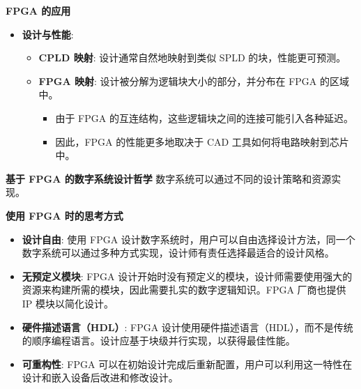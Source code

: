 \begin{frame}[allowframebreaks]{\textbf{FPGA 的应用}}
\begin{itemize}
\begin{itemize}
    \begin{itemize}
    \tightlist
    \item
        利用可编程部分``执行''软件，而不是将软件编译为在常规 CPU 上执行。
    \item
        相关资源：IEEE 举办的 FPGA-Based Custom Computing Workshop
        (FCCM)。
    \end{itemize}
    \end{itemize}
\item
    \textbf{设计与性能}:

    \begin{itemize}
    \tightlist
    \item
    \textbf{CPLD 映射}: 设计通常自然地映射到类似 SPLD
    的块，性能更可预测。
    \item
    \textbf{FPGA 映射}: 设计被分解为逻辑块大小的部分，并分布在 FPGA
    的区域中。

    \begin{itemize}
    \tightlist
    \item
        由于 FPGA 的互连结构，这些逻辑块之间的连接可能引入各种延迟。
    \item
        因此，FPGA 的性能更多地取决于 CAD 工具如何将电路映射到芯片中。
    \end{itemize}
    \end{itemize}
\end{itemize}
\end{frame}

\begin{frame}[allowframebreaks]{\textbf{基于 FPGA 的数字系统设计哲学}}
    数字系统可以通过不同的设计策略和资源实现。



\begin{block}{\textbf{使用 FPGA 时的思考方式}}
\begin{itemize}
\tightlist
\item
    \textbf{设计自由}: 使用 FPGA
    设计数字系统时，用户可以自由选择设计方法，同一个数字系统可以通过多种方式实现，设计师有责任选择最适合的设计风格。
\item
    \textbf{无预定义模块}: FPGA
    设计开始时没有预定义的模块，设计师需要使用强大的资源来构建所需的模块，因此需要扎实的数字逻辑知识。FPGA
    厂商也提供 IP 模块以简化设计。
\item
    \textbf{硬件描述语言（HDL）}: FPGA
    设计使用硬件描述语言（HDL），而不是传统的顺序编程语言。设计应基于块级并行实现，以获得最佳性能。
\item
    \textbf{可重构性}: FPGA
    可以在初始设计完成后重新配置，用户可以利用这一特性在设计和嵌入设备后改进和修改设计。
\end{itemize}
\end{block}
\end{frame}

